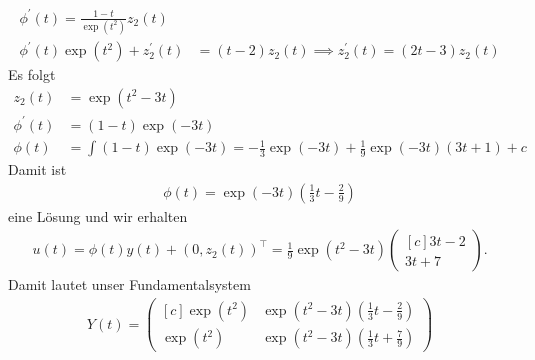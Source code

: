 \begin{solution}
\begin{align*}
  \phi^{\prime}(t) = \frac{1-t}{\exp(t^2)}z_2(t)\\
  \phi^{\prime}(t)\exp(t^2) + z_2^{\prime}(t) &=  (t -2)z_2(t) \implies
  z_2^{\prime}(t) = (2t - 3)z_2(t)
\end{align*}
Es folgt
\begin{align*}
  z_2(t) &= \exp(t^2 - 3t) \\
  \phi^{\prime}(t) &= (1 - t)\exp(-3t) \\
  \phi(t) &= \int (1 - t)\exp(-3t) = -\frac{1}{3}\exp(-3t) + \frac{1}{9}\exp(-3t)
  (3t + 1) + c
\end{align*}
Damit ist
\begin{align*}
  \phi(t) = \exp(-3t)\left(\frac{1}{3}t - \frac{2}{9}\right)
\end{align*}
eine Lösung und wir erhalten
\begin{align*}
  u(t) = \phi(t)y(t) + (0,z_2(t))^{\top} = \frac{1}{9}\exp(t^2-3t)\begin{pmatrix*}[c]
  3t - 2 \\
  3t + 7
  \end{pmatrix*}.
\end{align*}
Damit lautet unser Fundamentalsystem
\begin{align*}
  Y(t) = \begin{pmatrix*}[c]
    \exp(t^2) & \exp(t^2-3t)(\frac{1}{3}t - \frac{2}{9}) \\
    \exp(t^2) & \exp(t^2-3t)(\frac{1}{3}t + \frac{7}{9})
  \end{pmatrix*}
\end{align*}
\end{solution}
